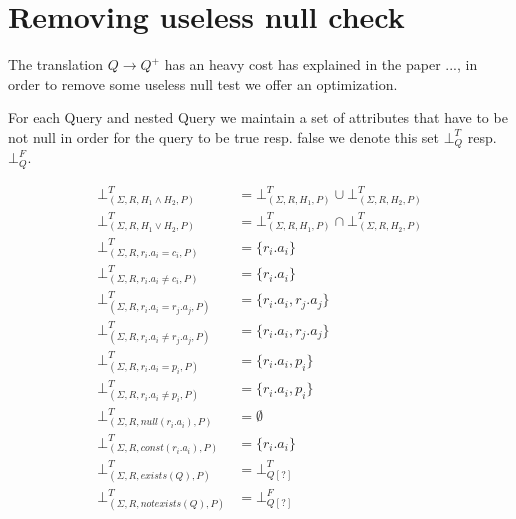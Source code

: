 \section{Removing useless null check}
The translation $Q \rightarrow Q^+$ has an heavy cost has explained in the paper ..., in order to remove some useless null test we offer an optimization.

\begin{mydef}
	For each Query and nested Query we maintain a set of attributes that have to be not null in order for the query to be true resp. false we denote this set $\bot^T_{Q}$ resp.$\bot^F_{Q}$.
\end{mydef} 

\begin{mydef}
	\begin{align*}
		\bot^T_{(\Sigma,R,H_1 \land H_2,P)} & = \bot^T_{(\Sigma,R,H_1,P)} \cup \bot^T_{(\Sigma,R,H_2,P)} \\
		\bot^T_{(\Sigma,R,H_1 \lor H_2,P)} & = \bot^T_{(\Sigma,R,H_1,P)} \cap \bot^T_{(\Sigma,R,H_2,P)} \\
		\bot^T_{(\Sigma,R,r_i.a_i = c_i,P)} & = \{r_i.a_i\} \\
		\bot^T_{(\Sigma,R,r_i.a_i \neq c_i,P)} & = \{r_i.a_i\} \\
		\bot^T_{(\Sigma,R,r_i.a_i = r_j.a_j,P)} & = \{r_i.a_i,r_j.a_j\} \\
		\bot^T_{(\Sigma,R,r_i.a_i \neq r_j.a_j,P)} & = \{r_i.a_i,r_j.a_j\} \\
		\bot^T_{(\Sigma,R,r_i.a_i = p_i,P)} & = \{r_i.a_i,p_i\} \\
		\bot^T_{(\Sigma,R,r_i.a_i \neq p_i,P)} & = \{r_i.a_i,p_i\} \\
		\bot^T_{(\Sigma,R,null(r_i.a_i),P)} & = \emptyset \\
		\bot^T_{(\Sigma,R,const(r_i.a_i),P)} & = \{r_i.a_i\} \\
		\bot^T_{(\Sigma,R,exists(Q),P)} & = \bot^T_{Q[?]} \\
		\bot^T_{(\Sigma,R,notexists(Q),P)} & = \bot^F_{Q[?]}\\
	\end{align*}
	

\end{mydef}
